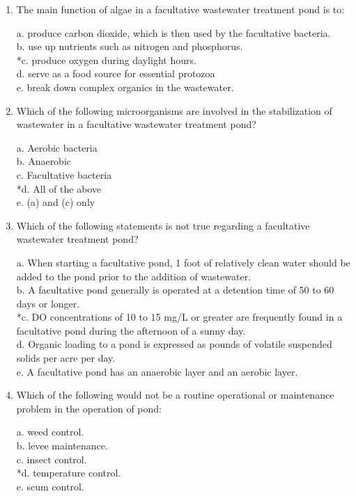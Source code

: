 \begin{enumerate}
\item  The main function of algae in a facultative wastewater treatment pond is to: 

a. produce carbon dioxide, which is then used by the facultative bacteria. \\
b. use up nutrients such as nitrogen and phosphorus. \\
*c. produce oxygen during daylight hours. \\
d. serve as a food source for essential protozoa \\
e. break down complex organics in the wastewater. 


\item  Which of the following microorganisms are involved in the stabilization of wastewater in a facultative wastewater treatment pond? 

a. Aerobic bacteria \\
b. Anaerobic \\
c. Facultative bacteria \\
*d. All of the above \\
e. (a) and (c) only 


\item  Which of the following statements is not true regarding a facultative wastewater treatment pond? 

a. When starting a facultative pond, 1 foot of relatively clean water should be added to the pond prior to the addition of wastewater. \\
b. A facultative pond generally is operated at a detention time of 50 to 60 days or longer. \\
*c. DO concentrations of 10 to 15 mg/L or greater are frequently found in a facultative pond during the afternoon of a sunny day. \\
d. Organic loading to a pond is expressed as pounds of volatile suspended solids per acre per day. \\
e. A facultative pond has an anaerobic layer and an aerobic layer. 


\item  Which of the following would not be a routine operational or maintenance problem in the operation of pond: 

a. weed control. \\
b. levee maintenance. \\
c. insect control. \\
*d. temperature control. \\
e. scum control. 



\end{enumerate}

